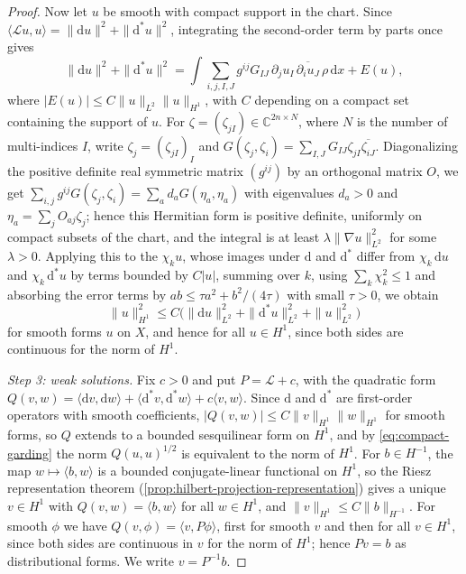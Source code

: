 \begin{proof}
Now let $u$ be smooth with compact support in the chart. Since $\langle\mathcal Lu,u\rangle=\|\mathrm du\|^2+\|\mathrm d^*u\|^2$, integrating the second-order term by parts once gives
\[
 \|\mathrm du\|^2+\|\mathrm d^*u\|^2
 =\int\sum_{i,j,I,J}g^{ij}G_{IJ}\,\partial_ju_I\,\overline{\partial_iu_J}\,\rho\,\mathrm dx+E(u),
\]
where $|E(u)|\leq C\|u\|_{L^2}\|u\|_{H^1}$, with $C$ depending on a compact set containing the support of $u$. For $\zeta=(\zeta_{jI})\in\mathbb C^{2n\times N}$, where $N$ is the number of multi-indices $I$, write $\zeta_j=(\zeta_{jI})_I$ and $G(\zeta_j,\zeta_i)=\sum_{I,J}G_{IJ}\zeta_{jI}\overline{\zeta_{iJ}}$. Diagonalizing the positive definite real symmetric matrix $(g^{ij})$ by an orthogonal matrix $O$, we get $\sum_{i,j}g^{ij}G(\zeta_j,\zeta_i)=\sum_ad_aG(\eta_a,\eta_a)$ with eigenvalues $d_a>0$ and $\eta_a=\sum_jO_{aj}\zeta_j$; hence this Hermitian form is positive definite, uniformly on compact subsets of the chart, and the integral is at least $\lambda\|\nabla u\|_{L^2}^2$ for some $\lambda>0$. Applying this to the $\chi_ku$, whose images under $\mathrm d$ and $\mathrm d^*$ differ from $\chi_k\,\mathrm du$ and $\chi_k\,\mathrm d^*u$ by terms bounded by $C|u|$, summing over $k$, using $\sum_k\chi_k^2\leq1$ and absorbing the error terms by $ab\leq\tau a^2+b^2/(4\tau)$ with small $\tau>0$, we obtain
\begin{equation}\label{eq:compact-garding}
 \|u\|_{H^1}^2\leq C\bigl(\|\mathrm du\|_{L^2}^2+
       \|\mathrm d^*u\|_{L^2}^2+\|u\|_{L^2}^2\bigr)
\end{equation}
for smooth forms $u$ on $X$, and hence for all $u\in H^1$, since both sides are continuous for the norm of $H^1$.

\emph{Step 3: weak solutions.} Fix $c>0$ and put $P=\mathcal L+c$, with the quadratic form $Q(v,w)=\langle\mathrm dv,\mathrm dw\rangle+\langle\mathrm d^*v,\mathrm d^*w\rangle+c\langle v,w\rangle$. Since $\mathrm d$ and $\mathrm d^*$ are first-order operators with smooth coefficients, $|Q(v,w)|\leq C\|v\|_{H^1}\|w\|_{H^1}$ for smooth forms, so $Q$ extends to a bounded sesquilinear form on $H^1$, and by \eqref{eq:compact-garding} the norm $Q(u,u)^{1/2}$ is equivalent to the norm of $H^1$. For $b\in H^{-1}$, the map $w\mapsto\langle b,w\rangle$ is a bounded conjugate-linear functional on $H^1$, so the Riesz representation theorem (\cref{prop:hilbert-projection-representation}) gives a unique $v\in H^1$ with $Q(v,w)=\langle b,w\rangle$ for all $w\in H^1$, and $\|v\|_{H^1}\leq C\|b\|_{H^{-1}}$. For smooth $\phi$ we have $Q(v,\phi)=\langle v,P\phi\rangle$, first for smooth $v$ and then for all $v\in H^1$, since both sides are continuous in $v$ for the norm of $H^1$; hence $Pv=b$ as distributional forms. We write $v=P^{-1}b$.


\end{proof}
